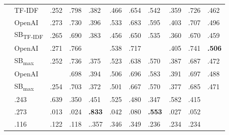 \begin{table}
\begin{tabularx}{\columnwidth}{@{}llZZZZZZZZZ@{}}
 & TF-IDF                       & .252 & .798 & .382 & .466 & .654 & .542 & .359 & .726 & .462 \\
\hline{}
 & OpenAI    & .273 & .730 & .396 & .533 & .683 & .595 & .403 & .707 & .496 \\
 & SB\textsubscript{TF-IDF}     & .265 & .690 & .383 & .456 & .650 & .535 & .360 & .670 & .459 \\
\hline{}
 & OpenAI   & .271 & .766 &  & .538 & .717 &  & .405 & .741 & \textbf{.506 }\\
 & SB\textsubscript{max}        & .252 & .736 & .375 & .523 & .638 & .570 & .387 & .687 & .472 \\
\hline{}
 & OpenAI   &  & .698 & .394 & .506 & .696 & .583 & .391 & .697 & .488 \\
 & SB\textsubscript{max}        & .254 & .703 & .372 & .501 & .667 & .570 & .377 & .685 & .471 \\
\hline{}
 & .243 & .639 & .350 & .451 & .525 & .480 & .347 & .582 & .415  \\
\hline{}
   & .273 & .013 & .024 & \textbf{.833} & .042 & .080 & \textbf{.553} & .027 & .052 \\
\hline{}
 & .116 & .122 & .118 & ..357 & .346 & .349 & .236 & .234 & .234  \\



        \bottomrule
    \end{tabularx}
\end{table}